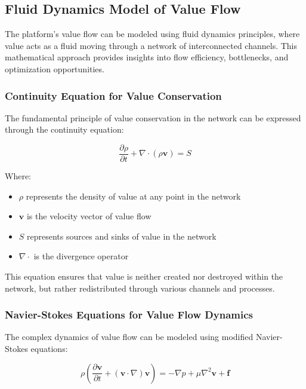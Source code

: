 \subsection{Fluid Dynamics Model of Value Flow}

The platform's value flow can be modeled using fluid dynamics principles, where value acts as a fluid moving through a network of interconnected channels. This mathematical approach provides insights into flow efficiency, bottlenecks, and optimization opportunities.

\subsubsection{Continuity Equation for Value Conservation}

The fundamental principle of value conservation in the network can be expressed through the continuity equation:

\begin{equation}
\frac{\partial \rho}{\partial t} + \nabla \cdot (\rho \mathbf{v}) = S
\end{equation}

Where:
\begin{itemize}
    \item $\rho$ represents the density of value at any point in the network
    \item $\mathbf{v}$ is the velocity vector of value flow
    \item $S$ represents sources and sinks of value in the network
    \item $\nabla \cdot$ is the divergence operator
\end{itemize}

This equation ensures that value is neither created nor destroyed within the network, but rather redistributed through various channels and processes.

\subsubsection{Navier-Stokes Equations for Value Flow Dynamics}

The complex dynamics of value flow can be modeled using modified Navier-Stokes equations:

\begin{equation}
\rho \left(\frac{\partial \mathbf{v}}{\partial t} + (\mathbf{v} \cdot \nabla)\mathbf{v}\right) = -\nabla p + \mu \nabla^2 \mathbf{v} + \mathbf{f}
\end{equation}

